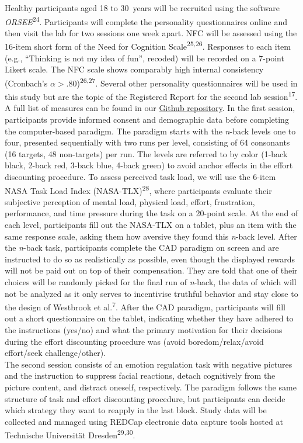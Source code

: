\documentclass[
  man,floatsintext]{apa6}
\begin{document}
Healthy participants aged 18 to 30~years will be recruited using the software \emph{ORSEE}\textsuperscript{24}.
Participants will complete the personality questionnaires online and then visit the lab for two sessions one week apart.
NFC will be assessed using the 16-item short form of the Need for Cognition Scale\textsuperscript{25,26}.
Responses to each item (e.g., ``Thinking is not my idea of fun'', recoded) will be recorded on a 7-point Likert scale.
The NFC scale shows comparably high internal consistency (Cronbach's \(\alpha>.80\))\textsuperscript{26,27}.
Several other personality questionnaires will be used in this study but are the topic of the Registered Report for the second lab session\textsuperscript{17}.
A full list of measures can be found in our \href{https://github.com/ChScheffel/CAD}{Github repository}.
In the first session, participants provide informed consent and demographic data before completing the computer-based paradigm.
The paradigm starts with the \emph{n}-back levels one to four, presented sequentially with two runs per level, consisting of 64 consonants (16 targets, 48 non-targets) per run.
The levels are referred to by color (1-back black, 2-back red, 3-back blue, 4-back green) to avoid anchor effects in the effort discounting procedure.
To assess perceived task load, we will use the 6-item NASA Task Load Index (NASA-TLX)\textsuperscript{28}, where participants evaluate their subjective perception of mental load, physical load, effort, frustration, performance, and time pressure during the task on a 20-point scale.
At the end of each level, participants fill out the NASA-TLX on a tablet, plus an item with the same response scale, asking them how aversive they found this \emph{n}-back level.
After the \emph{n}-back task, participants complete the CAD paradigm on screen and are instructed to do so as realistically as possible, even though the displayed rewards will not be paid out on top of their compensation.
They are told that one of their choices will be randomly picked for the final run of \emph{n}-back, the data of which will not be analyzed as it only serves to incentivise truthful behavior and stay close to the design of Westbrook et al.\textsuperscript{7}.
After the CAD paradigm, participants will fill out a short questionnaire on the tablet, indicating whether they have adhered to the instructions (yes/no) and what the primary motivation for their decisions during the effort discounting procedure was (avoid boredom/relax/avoid effort/seek challenge/other).\\
The second session consists of an emotion regulation task with negative pictures and the instruction to suppress facial reactions, detach cognitively from the picture content, and distract oneself, respectively.
The paradigm follows the same structure of task and effort discounting procedure, but participants can decide which strategy they want to reapply in the last block.
Study data will be collected and managed using REDCap electronic data capture tools hosted at Technische Universität Dresden\textsuperscript{29,30}.
\end{document}
